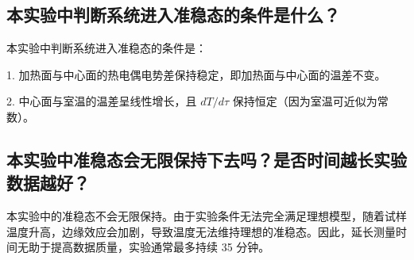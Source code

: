 \documentclass[signature=data]{physicsreport}
\begin{document}
\subsection{本实验中判断系统进入准稳态的条件是什么？}

本实验中判断系统进入准稳态的条件是：

1. 加热面与中心面的热电偶电势差保持稳定，即加热面与中心面的温差不变。

2. 中心面与室温的温差呈线性增长，且 $ dT/d\tau $ 保持恒定（因为室温可近似为常数）。

\subsection{本实验中准稳态会无限保持下去吗？是否时间越长实验数据越好？}
本实验中的准稳态不会无限保持。由于实验条件无法完全满足理想模型，随着试样温度升高，边缘效应会加剧，导致温度无法维持理想的准稳态。因此，延长测量时间无助于提高数据质量，实验通常最多持续 35 分钟。
\end{document}
